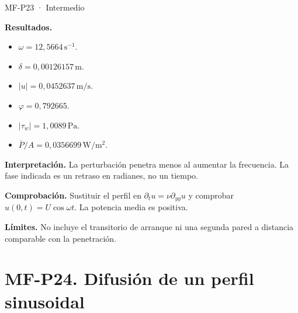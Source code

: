 \begin{studiumworked}{MF-P23 · Intermedio}
\begin{enumerate}
\end{enumerate}

\textbf{Resultados.}\begin{itemize}

\item $\omega=12{,}5664\,\mathrm{s^{-1}}$.

\item $\delta=0{,}00126157\,\mathrm{m}$.

\item $|u|=0{,}0452637\,\mathrm{m/s}$.

\item $\varphi=0{,}792665$.

\item $|\tau_w|=1{,}0089\,\mathrm{Pa}$.

\item $\overline P/A=0{,}0356699\,\mathrm{W/m^2}$.

\end{itemize}

\textbf{Interpretación.} La perturbación penetra menos al aumentar la frecuencia. La fase indicada es un retraso en radianes, no un tiempo.

\textbf{Comprobación.} Sustituir el perfil en $\partial_tu=\nu\partial_{yy}u$ y comprobar $u(0,t)=U\cos\omega t$. La potencia media es positiva.

\textbf{Límites.} No incluye el transitorio de arranque ni una segunda pared a distancia comparable con la penetración.

\end{studiumworked}



\Needspace{.30\textheight}\section{MF-P24. Difusión de un perfil sinusoidal}

